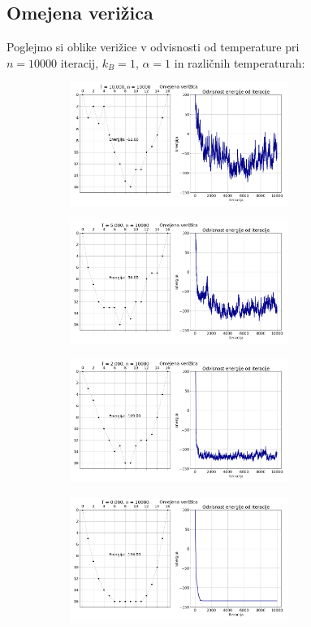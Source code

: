 \documentclass[11pt, a4paper]{article}
\begin{document}
\begin{figure}[H]
\subsection{Omejena verižica}
Poglejmo si oblike verižice v odvisnosti od temperature pri $n=10000$ iteracij, $k_B = 1$, $\alpha = 1$ in različnih temperaturah:
\begin{figure}[H]
\centering

  \includegraphics[width=16cm, height=4cm]{omejena_globina_T0_10.png}
 
\end{figure} 
\begin{figure}[H]
\centering

  \includegraphics[width=16cm, height=4cm]{omejena_globina_T0_5.png}
 
\end{figure} 
\begin{figure}[H]
\centering

  \includegraphics[width=16cm, height=4cm]{omejena_globina_T0_2.png}
 
\end{figure} 
\begin{figure}[H]

\centering
  \includegraphics[width=16cm, height=4cm]{omejena_globina_T0_0.png}
 

\end{figure}
\end{figure}
\end{document}
